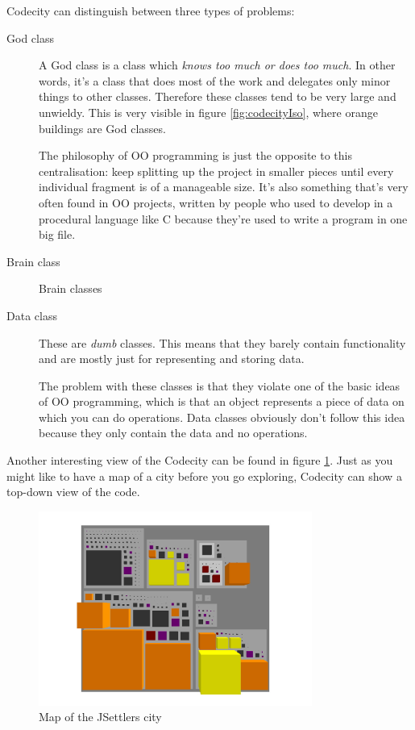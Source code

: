 \documentclass[pdftex12pt, a4paper]{article}
\begin{document}
Codecity can distinguish between three types of problems:
\begin{description}
\item[God class] A God class is a class which \emph{knows too much or does too much}.
In other words, it's a class that does most of the work and delegates only minor things to other classes.
Therefore these classes tend to be very large and unwieldy.
This is very visible in figure \ref{fig:codecityIso}, where orange buildings are God classes.

The philosophy of OO programming is just the opposite to this centralisation: keep splitting up the project in smaller pieces until every individual fragment is of a manageable size.
It's also something that's very often found in OO projects, written by people who used to develop in a procedural language like C because they're used to write a program in one big file.

\item[Brain class] Brain classes 

\item[Data class] These are \emph{dumb} classes.
This means that they barely contain functionality and are mostly just for representing and storing data.

The problem with these classes is that they violate one of the basic ideas of OO programming, which is that an object represents a piece of data on which you can do operations.
Data classes obviously don't follow this idea because they only contain the data and no operations.

\end{description}

Another interesting view of the Codecity can be found in figure \ref{fig:codecityMap}.
Just as you might like to have a map of a city before you go exploring, Codecity can show a top-down view of the code.

\begin{figure}
\begin{center}
\includegraphics[width=0.8\textwidth]{Image/Codecity/Codecity3.jpg}
\caption{Map of the JSettlers city}
\label{fig:codecityMap}
\end{center}
\end{figure}
\end{document}
